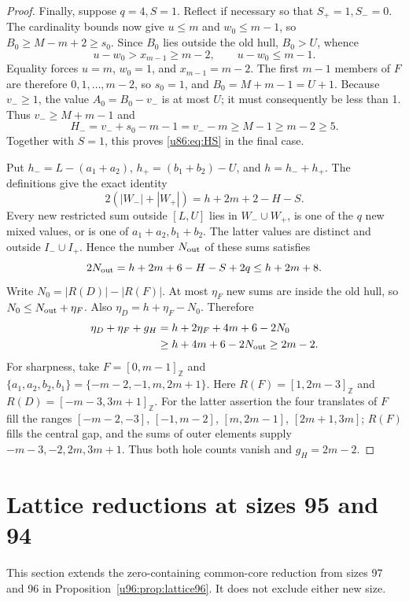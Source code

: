 \documentclass[11pt,a4paper]{article}
\theoremstyle{remark}
\newcommand{\Z}{\mathbb Z}
\begin{document}
\begin{proof}
Finally, suppose $q=4,S=1$. Reflect if necessary so that
$S_+=1,S_-=0$. The cardinality bounds now give $u\le m$ and
$w_0\le m-1$, so $B_0\ge M-m+2\ge s_0$. Since $B_0$ lies outside the
old hull, $B_0>U$, whence
\[
 u-w_0>x_{m-1}\ge m-2,\qquad u-w_0\le m-1.
\]
Equality forces $u=m$, $w_0=1$, and $x_{m-1}=m-2$. The first $m-1$
members of $F$ are therefore $0,1,\ldots,m-2$, so $s_0=1$, and
$B_0=M+m-1=U+1$. Because $v_-\ge1$, the value $A_0=B_0-v_-$ is at most
$U$; it must consequently be less than 1. Thus $v_-\ge M+m-1$ and
\[
 H_-=v_-+s_0-m-1=v_--m\ge M-1\ge m-2\ge5.
\]
Together with $S=1$, this proves \eqref{u86:eq:HS} in the final case.

Put $h_-=L-(a_1+a_2)$, $h_+=(b_1+b_2)-U$, and $h=h_-+h_+$.
The definitions give the exact identity
\[
 2(|W_-|+|W_+|)=h+2m+2-H-S.
\]
Every new restricted sum outside $[L,U]$ lies in $W_-\cup W_+$, is one
of the $q$ new mixed values, or is one of $a_1+a_2,b_1+b_2$. The latter
values are distinct and outside $I_-\cup I_+$. Hence the number $N_{\rm out}$
of these sums satisfies
\[
 2N_{\rm out}=h+2m+6-H-S+2q\le h+2m+8.
\]
Write $N_0=|R(D)|-|R(F)|$. At most $\eta_F$ new sums are inside the old
hull, so $N_0\le N_{\rm out}+\eta_F$. Also
$\eta_D=h+\eta_F-N_0$. Therefore
\begin{align*}
 \eta_D+\eta_F+g_H
 &=h+2\eta_F+4m+6-2N_0\\
 &\ge h+4m+6-2N_{\rm out}\ge2m-2.
\end{align*}
For sharpness, take $F=[0,m-1]_{\Z}$ and
$\{a_1,a_2,b_2,b_1\}=\{-m-2,-1,m,2m+1\}$.
Here $R(F)=[1,2m-3]_{\Z}$ and $R(D)=[-m-3,3m+1]_{\Z}$.
For the latter assertion the four translates of $F$ fill the ranges
$[-m-2,-3]$, $[-1,m-2]$, $[m,2m-1]$, $[2m+1,3m]$;
$R(F)$ fills the central gap, and the sums of outer elements supply
$-m-3,-2,2m,3m+1$. Thus both hole counts vanish and $g_H=2m-2$.
\end{proof}

\section{Lattice reductions at sizes 95 and 94}\label{u86:sec:lattice}
This section extends the zero-containing common-core reduction from sizes
97 and 96 in Proposition~\ref{u96:prop:lattice96}. It does not exclude either new size.
\end{document}
